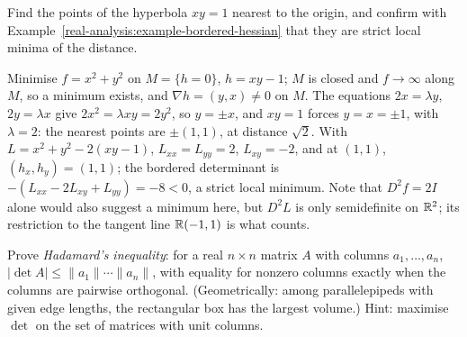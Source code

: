 \begin{exercise}\label{real-analysis:exercise-hyperbola-distance}
Find the points of the hyperbola $xy = 1$ nearest to the origin, and confirm with Example~\ref{real-analysis:example-bordered-hessian} that they are strict local minima of the distance.
\end{exercise}

\begin{solution}
Minimise $f = x^2 + y^2$ on $M = \{h = 0\}$, $h = xy - 1$; $M$ is closed and $f \to \infty$ along $M$, so a minimum exists, and $\nabla h = (y, x) \neq 0$ on $M$. The equations $2x = \lambda y$, $2y = \lambda x$ give
$2x^2 = \lambda xy = 2y^2$, so $y = \pm x$, and $xy = 1$ forces $y = x = \pm1$, with $\lambda = 2$: the nearest points are $\pm(1, 1)$, at distance $\sqrt2$. With $L = x^2 + y^2 - 2(xy - 1)$,
$L_{xx} = L_{yy} = 2$, $L_{xy} = -2$, and at $(1, 1)$, $(h_x, h_y) = (1, 1)$; the bordered determinant is $-(L_{xx} - 2L_{xy} + L_{yy}) = -8 < 0$, a strict local minimum. Note that $D^2f = 2I$ alone would also
suggest a minimum here, but $D^2L$ is only semidefinite on $\mathbb{R}^2$; its restriction to the tangent line $\mathbb{R}(-1, 1)$ is what counts.
\end{solution}

\begin{exercise}\label{real-analysis:exercise-hadamard}
Prove \emph{Hadamard's inequality}: for a real $n \times n$ matrix $A$ with columns $a_1, \ldots, a_n$, $|\det A| \leq \|a_1\|\cdots\|a_n\|$, with equality for nonzero columns exactly when the columns are
pairwise orthogonal. (Geometrically: among parallelepipeds with given edge lengths, the rectangular box has the largest volume.) Hint: maximise $\det$ on the set of matrices with unit columns.
\end{exercise}

